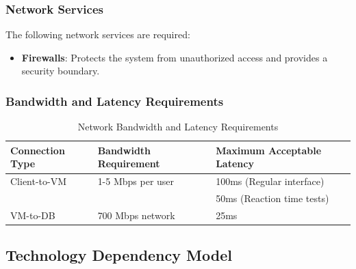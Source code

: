 \subsubsection{Network Services}

The following network services are required:

\begin{itemize}
    \item \textbf{Firewalls}: Protects the system from unauthorized access and provides a security boundary.
\end{itemize}

\subsubsection{Bandwidth and Latency Requirements}

\begin{table}[H]
    \centering
    \caption{Network Bandwidth and Latency Requirements}
    \label{tab:network_requirements}
    \begin{tabular}{|p{}|p{}|p{}|}
        \hline
        \textbf{Connection Type} & \textbf{Bandwidth Requirement} & \textbf{Maximum Acceptable Latency} \\
        \hline
        Client-to-VM             & 1-5 Mbps per user              & 100ms (Regular interface)           \\
                                 &                                & 50ms (Reaction time tests)          \\
        \hline
        VM-to-DB                 & 700 Mbps  network              & 25ms                                \\
        \hline
    \end{tabular}
\end{table}

\subsection{Technology Dependency Model}

